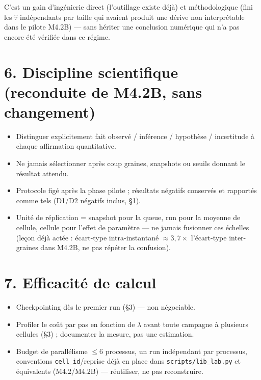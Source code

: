 \documentclass[11pt,a4paper]{article}
\newcommand{\code}[1]{\texttt{#1}}
\begin{document}
C'est un gain d'ingénierie direct (l'outillage existe déjà) et
méthodologique (fini les $\hat\tau$ indépendants par taille qui
avaient produit une dérive non interprétable dans le pilote M4.2B) ---
sans hériter une conclusion numérique qui n'a pas encore été vérifiée
dans ce régime.

\section*{6. Discipline scientifique (reconduite de M4.2B, sans changement)}

\begin{itemize}
\item Distinguer explicitement fait observé / inférence / hypothèse /
  incertitude à chaque affirmation quantitative.
\item Ne jamais sélectionner après coup graines, snapshots ou seuils
  donnant le résultat attendu.
\item Protocole figé après la phase pilote ; résultats négatifs
  conservés et rapportés comme tels (D1/D2 négatifs inclus, \S1).
\item Unité de réplication = snapshot pour la queue, run pour la
  moyenne de cellule, cellule pour l'effet de paramètre --- ne jamais
  fusionner ces échelles (leçon déjà actée : écart-type
  intra-instantané $\approx3{,}7\times$ l'écart-type inter-graines
  dans M4.2B, ne pas répéter la confusion).
\end{itemize}

\section*{7. Efficacité de calcul}

\begin{itemize}
\item Checkpointing dès le premier run (\S3) --- non négociable.
\item Profiler le coût par pas en fonction de $\lambda$ avant toute
  campagne à plusieurs cellules (\S3) ; documenter la mesure, pas une
  estimation.
\item Budget de parallélisme $\le6$ processus, un run indépendant par
  processus, conventions \code{cell\_id}/reprise déjà en place dans
  \code{scripts/lib\_lab.py} et équivalents (M4.2/M4.2B) ---
  réutiliser, ne pas reconstruire.
\end{itemize}
\end{document}
